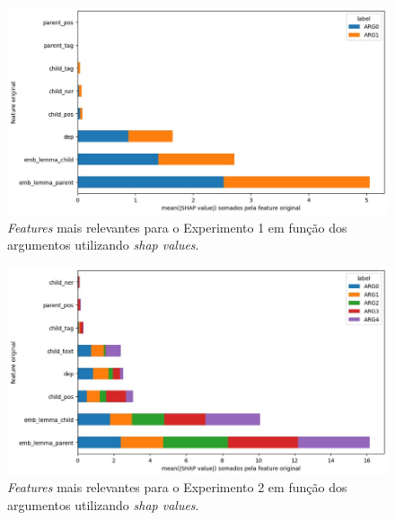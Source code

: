 \begin{figure}[h]
  \centering
  \begin{minipage}{.75\textwidth}
  \includegraphics[width=\textwidth]{figure08.jpg}
  \caption{\emph{Features} mais relevantes para o Experimento 1 em função dos argumentos utilizando \emph{shap values}.}
  \label{fig-08}
  \end{minipage}
\end{figure}

\begin{figure}[h]
  \centering
  \begin{minipage}{.75\textwidth}
  \includegraphics[width=\textwidth]{figure09.jpg}
  \caption{\emph{Features} mais relevantes para o Experimento 2 em função dos argumentos utilizando \emph{shap values}.}
  \label{fig-09}
  \end{minipage}
\end{figure}


